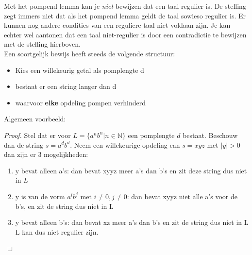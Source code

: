Met het pompend lemma kan je \emph{niet} bewijzen dat een taal regulier is. De stelling zegt immers niet dat als het pompend lemma geldt de taal sowieso regulier is. Er kunnen nog andere condities van een reguliere taal niet voldaan zijn.
Je kan echter wel aantonen dat een taal niet-regulier is door een contradictie te bewijzen met de stelling hierboven.\\
Een soortgelijk bewijs heeft steeds de volgende structuur:
\begin{itemize}
\item Kies een willekeurig getal als pomplengte d
\item bestaat er een string langer dan d
\item waarvoor \textbf{elke} opdeling pompen verhinderd
\end{itemize}

Algemeen voorbeeld:
\begin{proof}
Stel dat er voor $L= \{a^nb^n | n \in \mathbb{N}\}$ een pomplengte $d$ bestaat. Beschouw dan de string $s=a^db^d$. Neem een willekeurige opdeling can $s=xyz$ met $|y| > 0$ dan zijn er 3 mogelijkheden:
\begin{enumerate}
\item y bevat alleen a's: dan bevat xyyz meer a's dan b's en zit deze string dus niet in $L$
\item y is van de vorm $a^ib^j$ met $i \neq 0, j \neq 0$: dan bevat xyyz niet alle a's voor de b's, en zit de string dus niet in L
\item y bevat alleen b's: dan bevat xz meer a's dan b's en zit de string dus niet in L
L kan dus niet regulier zijn.
\end{enumerate}
\end{proof}
